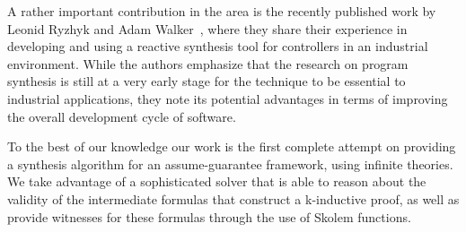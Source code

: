 A rather important contribution in the area is the recently published work by
Leonid Ryzhyk and Adam Walker~\cite{ryzhykdeveloping}, where they share their
experience in developing and using a reactive synthesis tool for controllers in
an industrial environment. While the authors emphasize that the research on
program synthesis is still at a very early stage for the technique to be
essential to industrial applications, they note its potential advantages in terms
of improving the overall development cycle of software.

To the best of our knowledge our work is the first complete attempt on providing
a synthesis algorithm for an assume-guarantee framework, using infinite theories.
We take advantage of a sophisticated solver that is able to reason about the
validity of the intermediate formulas that construct a k-inductive proof, as
well as provide witnesses for these formulas through the use of Skolem
functions.
\label{sec:related}

